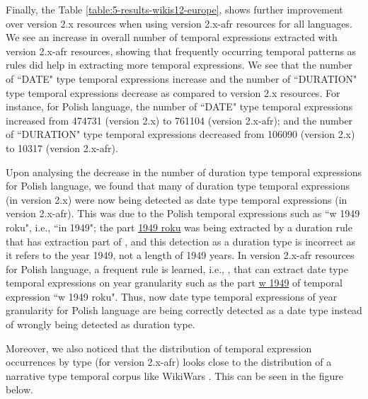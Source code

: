 Finally, the Table \ref{table:5-results-wikis12-europe}, shows further improvement over version 2.x resources when using version 2.x-afr resources for all languages. We see an increase in overall number of temporal expressions extracted with version 2.x-afr resources, showing that frequently occurring temporal patterns as rules did help in extracting more temporal expressions. We see that the number of ``DATE" type temporal expressions increase and the number of ``DURATION" type temporal expressions decrease as compared to version 2.x resources. For instance, for Polish language, the number of ``DATE" type temporal expressions increased from \num[group-separator={,}]{474731} (version 2.x) to \num[group-separator={,}]{761104} (version 2.x-afr); and the number of ``DURATION" type temporal expressions decreased from \num[group-separator={,}]{106090} (version 2.x) to \num[group-separator={,}]{10317} (version 2.x-afr). 

Upon analysing the decrease in the number of duration type temporal expressions for Polish language, we found that many of duration type temporal expressions (in version 2.x) were now being detected as date type temporal expressions (in version 2.x-afr). This was due to the Polish temporal expressions such as ``w 1949 roku", i.e., ``in 1949"; the part \underline{1949 roku} was being extracted by a duration rule that has extraction part of , and this detection as a duration type is incorrect as it refers to the year 1949, not a length of 1949 years. In version 2.x-afr resources for Polish language, a frequent rule is learned, i.e., , that can extract date type temporal expressions on year granularity such as the part \underline{w 1949} of temporal expression ``w 1949 roku". Thus, now date type temporal expressions of year granularity for Polish language are being correctly detected as a date type instead of wrongly being detected as duration type. 

Moreover, we also noticed that the distribution of temporal expression occurrences by type (for version 2.x-afr) looks close to the distribution of a narrative type temporal corpus like WikiWars \cite{mazur2010wikiwars}. This can be seen in the figure below.

